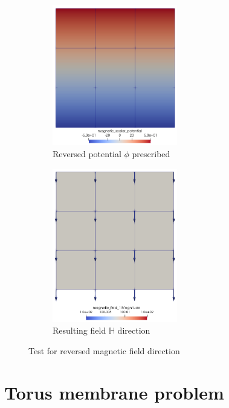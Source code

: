 \documentclass[11pt,a4paper,final]{article}
\begin{document}
\begin{figure}[h]
\centering
\begin{subfigure}{0.48\textwidth}
\centering
\includegraphics[width=0.6\textwidth]{coup_unit_test_mag_pot_rev.png}
\caption{Reversed potential $\phi$ prescribed}
\label{fig:3.10.1}
\end{subfigure}
\begin{subfigure}{0.48\textwidth}
\centering
\includegraphics[width=0.6\textwidth]{coup_unit_test_mag_field_rev.png}
\caption{Resulting field $\mathbb{H}$ direction}
\label{fig:3.10.2}
\end{subfigure}
\caption{Test for reversed magnetic field direction}
\label{fig:3.10}
\end{figure}

\section{Torus membrane problem}
\label{sec:torus_problem}
\end{document}
